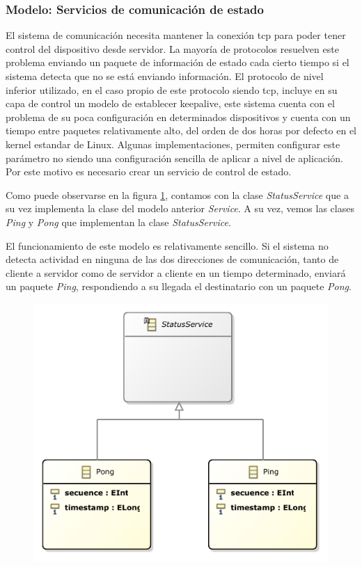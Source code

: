 \subsubsection{Modelo: Servicios de comunicación de estado}

El sistema de comunicación necesita mantener la conexión \gls{tcp} para poder tener control del dispositivo desde servidor.
La mayoría de protocolos resuelven este problema enviando un paquete de información de estado cada cierto tiempo si el sistema detecta que no se está enviando información.
El protocolo de nivel inferior utilizado, en el caso propio de este protocolo siendo \gls{tcp}, incluye en su capa de control un modelo de establecer \gls{keepalive}, este sistema cuenta con el problema de su poca configuración en determinados dispositivos y cuenta con un tiempo entre paquetes relativamente alto, del orden de dos horas por defecto en el kernel estandar de Linux. Algunas implementaciones, permiten configurar este parámetro no siendo una configuración sencilla de aplicar a nivel de aplicación. Por este motivo es necesario crear un servicio de control de estado.

Como puede observarse en la figura \ref{fig:modelo_servicios_comunicacion_estado_classes}, contamos con la clase \textit{StatusService} que a su vez implementa la clase del modelo anterior \textit{Service}. A su vez, vemos las clases \textit{Ping} y \textit{Pong} que implementan la clase \textit{StatusService}.

El funcionamiento de este modelo es relativamente sencillo. Si el sistema no detecta actividad en ninguna de las dos direcciones de comunicación, tanto de cliente a servidor como de servidor a cliente en un tiempo determinado, enviará un paquete \textit{Ping}, respondiendo a su llegada el destinatario con un paquete \textit{Pong}.

\begin{figure}
	\centering
    \includegraphics[height=0.3\textheight]{images/models/communicationstatus_class_diagram.pdf}
    \label{fig:modelo_servicios_comunicacion_estado_classes}
\end{figure}

\clearpage
